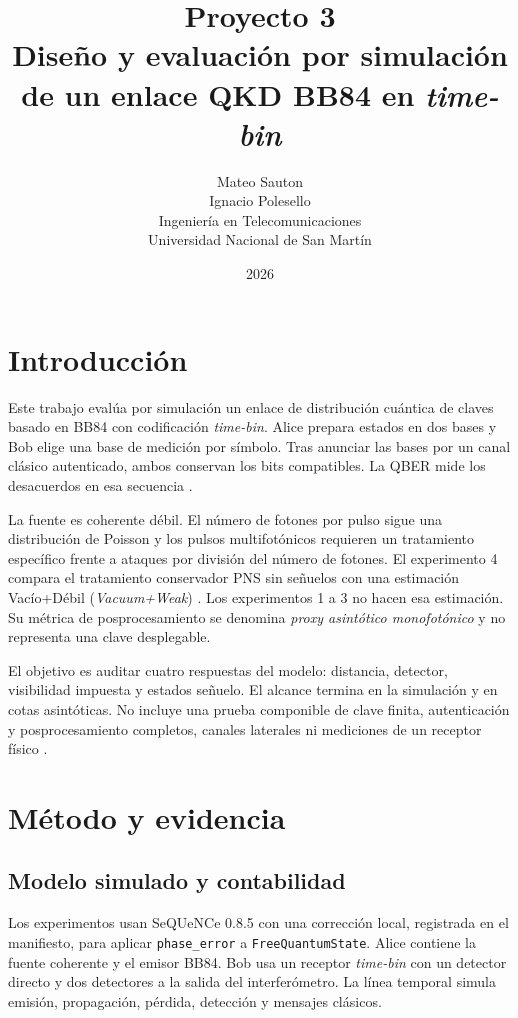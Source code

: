 \documentclass[12pt,a4paper]{article}
\title{
  \textbf{Proyecto 3}\\[0.35em]
  \large Diseño y evaluación por simulación de un enlace QKD BB84 en \textit{time-bin}
}
\author{
  Mateo Sauton\\
  Ignacio Polesello\\[0.5em]
  Ingeniería en Telecomunicaciones\\
  Universidad Nacional de San Martín
}
\date{2026}
\begin{document}
\maketitle

\section{Introducción}

Este trabajo evalúa por simulación un enlace de distribución cuántica de claves
basado en BB84 con codificación \textit{time-bin}. Alice prepara estados en dos
bases y Bob elige una base de medición por símbolo. Tras anunciar las bases por
un canal clásico autenticado, ambos conservan los bits compatibles. La QBER
mide los desacuerdos en esa secuencia \cite{bennettBrassard1984,gisin2002qkd}.

La fuente es coherente débil. El número de fotones por pulso sigue una
distribución de Poisson y los pulsos multifotónicos requieren un tratamiento
específico frente a ataques por división del número de fotones. El experimento
4 compara el tratamiento conservador PNS sin señuelos con una estimación
Vacío+Débil (\textit{Vacuum+Weak})
\cite{hwang2003decoy,loMaChen2005,maQiZhaoLo2005}. Los experimentos
1 a 3 no hacen esa estimación. Su métrica de posprocesamiento se denomina
\emph{proxy asintótico monofotónico} y no representa una clave desplegable.

El objetivo es auditar cuatro respuestas del modelo: distancia, detector,
visibilidad impuesta y estados señuelo. El alcance termina en la simulación y
en cotas asintóticas. No incluye una prueba componible de clave finita,
autenticación y posprocesamiento completos, canales laterales ni mediciones de
un receptor físico \cite{scarani2009security}.

\section{Método y evidencia}

\subsection*{Modelo simulado y contabilidad}

Los experimentos usan SeQUeNCe 0.8.5 \cite{wu2021sequence} con una corrección
local, registrada en el manifiesto, para aplicar \texttt{phase\_error} a
\texttt{FreeQuantumState}. Alice contiene la fuente coherente y el emisor BB84.
Bob usa un receptor \textit{time-bin} con un detector directo y dos detectores a
la salida del interferómetro. La línea temporal simula emisión, propagación,
pérdida, detección y mensajes clásicos.
\end{document}
